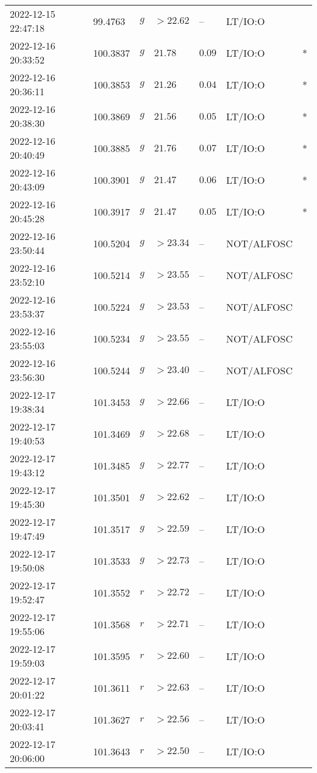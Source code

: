 \documentclass{nature_plusfigure}
\begin{document}
\begin{supplement}
\begin{center}
\begin{longtable}{lllllll}
2022-12-15 22:47:18 & 99.4763 & $g$ & $>22.62$ & -- & LT/IO:O &  \\ 
2022-12-16 20:33:52 & 100.3837 & $g$ & $21.78$ & $0.09$ & LT/IO:O & * \\ 
2022-12-16 20:36:11 & 100.3853 & $g$ & $21.26$ & $0.04$ & LT/IO:O & * \\ 
2022-12-16 20:38:30 & 100.3869 & $g$ & $21.56$ & $0.05$ & LT/IO:O & * \\ 
2022-12-16 20:40:49 & 100.3885 & $g$ & $21.76$ & $0.07$ & LT/IO:O & * \\ 
2022-12-16 20:43:09 & 100.3901 & $g$ & $21.47$ & $0.06$ & LT/IO:O & * \\ 
2022-12-16 20:45:28 & 100.3917 & $g$ & $21.47$ & $0.05$ & LT/IO:O & * \\ 
2022-12-16 23:50:44 & 100.5204 & $g$ & $>23.34$ & -- & NOT/ALFOSC &  \\ 
2022-12-16 23:52:10 & 100.5214 & $g$ & $>23.55$ & -- & NOT/ALFOSC &  \\ 
2022-12-16 23:53:37 & 100.5224 & $g$ & $>23.53$ & -- & NOT/ALFOSC &  \\ 
2022-12-16 23:55:03 & 100.5234 & $g$ & $>23.55$ & -- & NOT/ALFOSC &  \\ 
2022-12-16 23:56:30 & 100.5244 & $g$ & $>23.40$ & -- & NOT/ALFOSC &  \\ 
2022-12-17 19:38:34 & 101.3453 & $g$ & $>22.66$ & -- & LT/IO:O &  \\ 
2022-12-17 19:40:53 & 101.3469 & $g$ & $>22.68$ & -- & LT/IO:O &  \\ 
2022-12-17 19:43:12 & 101.3485 & $g$ & $>22.77$ & -- & LT/IO:O &  \\ 
2022-12-17 19:45:30 & 101.3501 & $g$ & $>22.62$ & -- & LT/IO:O &  \\ 
2022-12-17 19:47:49 & 101.3517 & $g$ & $>22.59$ & -- & LT/IO:O &  \\ 
2022-12-17 19:50:08 & 101.3533 & $g$ & $>22.73$ & -- & LT/IO:O &  \\ 
2022-12-17 19:52:47 & 101.3552 & $r$ & $>22.72$ & -- & LT/IO:O &  \\ 
2022-12-17 19:55:06 & 101.3568 & $r$ & $>22.71$ & -- & LT/IO:O &  \\ 
2022-12-17 19:59:03 & 101.3595 & $r$ & $>22.60$ & -- & LT/IO:O &  \\ 
2022-12-17 20:01:22 & 101.3611 & $r$ & $>22.63$ & -- & LT/IO:O &  \\ 
2022-12-17 20:03:41 & 101.3627 & $r$ & $>22.56$ & -- & LT/IO:O &  \\ 
2022-12-17 20:06:00 & 101.3643 & $r$ & $>22.50$ & -- & LT/IO:O &  \\ 

\end{longtable}
\end{center}
\end{supplement}
\end{document}

